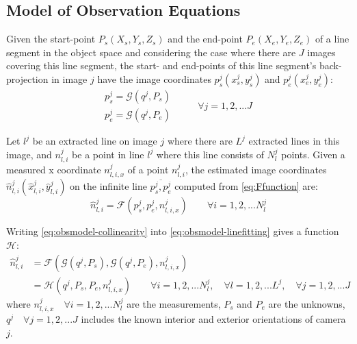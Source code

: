 
\subsection{Model of Observation Equations}
\label{subsec:ObsEqua}

Given the start-point $P_s(X_s,Y_s,Z_s)$ and the end-point $P_e(X_e,Y_e,Z_e)$ of a line segment in the object space and considering the case where there are $J$ images covering this line segment,  the start- and end-points of this line segment's back-projection in image $j$ have the image coordinates $p^j_s(x^j_s,y^j_s)$ and $p^j_e(x^j_e,y^j_e)$:
\begin{equation} \label{eq:obsmodel-collinearity}
\begin{split}
p^j_s = \mathcal{G}(q^j,P_s)\\
p^j_e = \mathcal{G}(q^j,P_e)
\end{split}
\qquad
\begin{split}
\forall j=1,2,...J
\end{split}
\end{equation}

Let $l^j$ be an extracted line on image $j$ where there are $L^j$ extracted lines in this image, and $n^j_{l,i}$ be a point in line $l^j$ where this line consists of $N^j_l$ points. Given a measured x coordinate $n^j_{l,i,x}$ of a point $n^j_{l,i}$, the estimated image coordinates $\hat{n}^j_{l,i}(\hat{x}^j_{l,i},\hat{y}^j_{l,i})$ on the infinite line $\overline{p^j_s,p^j_e}$ computed from \cref{eq:Ffunction} are:
\begin{equation} \label{eq:obsmodel-linefitting}
\hat{n}^j_{l,i} = \mathcal{F}(p^j_s,p^j_e,n^j_{l,i,x})
\qquad
\forall i=1,2,...N^j_l
\end{equation}

Writing \eqref{eq:obsmodel-collinearity} into \eqref{eq:obsmodel-linefitting} gives a function $\mathcal{H}$:
\begin{equation} \label{eq:obsmodel}
\begin{split}
\hat{n}^j_{l,i} &= \mathcal{F}(\mathcal{G}(q^j,P_s),\mathcal{G}(q^j,P_e),n^j_{l,i,x})\\
&=\mathcal{H}(q^j,P_s,P_e,n^j_{l,i,x})
\qquad
\forall i=1,2,...N^j_l,\quad\forall l=1,2,...L^j,\quad\forall j=1,2,...J
\end{split}
\end{equation}
where $n^j_{l,i,x}\quad\forall i=1,2,...N^j_l$ are the measurements, $P_s$ and $P_e$ are the unknowns, $q^j\quad\forall j=1,2,...J$ includes the known interior and exterior orientations of camera $j$.\newline

